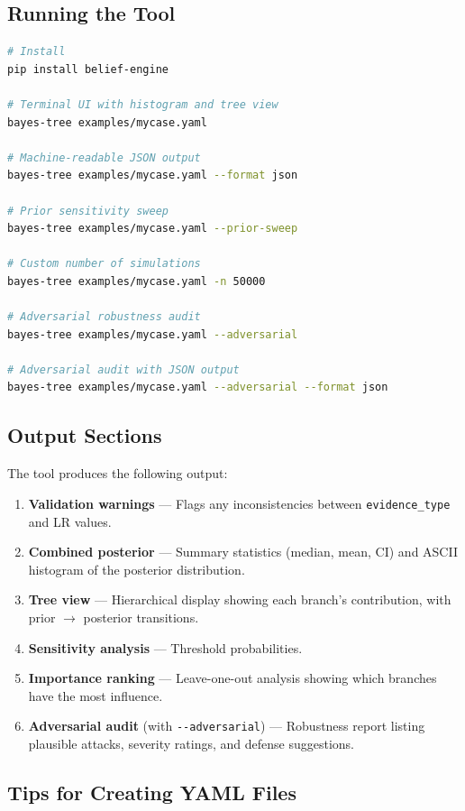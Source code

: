 \documentclass[11pt,a4paper]{article}
\begin{document}
\subsection{Running the Tool}

\begin{lstlisting}[language=bash]
# Install
pip install belief-engine

# Terminal UI with histogram and tree view
bayes-tree examples/mycase.yaml

# Machine-readable JSON output
bayes-tree examples/mycase.yaml --format json

# Prior sensitivity sweep
bayes-tree examples/mycase.yaml --prior-sweep

# Custom number of simulations
bayes-tree examples/mycase.yaml -n 50000

# Adversarial robustness audit
bayes-tree examples/mycase.yaml --adversarial

# Adversarial audit with JSON output
bayes-tree examples/mycase.yaml --adversarial --format json
\end{lstlisting}

\subsection{Output Sections}

The tool produces the following output:
\begin{enumerate}
\item \textbf{Validation warnings} --- Flags any inconsistencies between
  \texttt{evidence\_type} and LR values.
\item \textbf{Combined posterior} --- Summary statistics (median, mean, CI)
  and ASCII histogram of the posterior distribution.
\item \textbf{Tree view} --- Hierarchical display showing each branch's
  contribution, with prior $\to$ posterior transitions.
\item \textbf{Sensitivity analysis} --- Threshold probabilities.
\item \textbf{Importance ranking} --- Leave-one-out analysis showing which
  branches have the most influence.
\item \textbf{Adversarial audit} (with \texttt{-{}-adversarial}) --- Robustness
  report listing plausible attacks, severity ratings, and defense suggestions.
\end{enumerate}

\subsection{Tips for Creating YAML Files}
\end{document}
